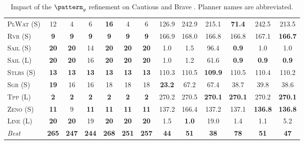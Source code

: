 \documentclass[11pt,landscape]{article}
\begin{document}
\begin{table}[tb]
{\begin{tabular}{|l||cccccc||cccccc||}
\textsc{PlWat} (S)&12&4&6&\textbf{16}&4&6&126.9&242.9&215.1&\textbf{71.4}&242.5&213.5\\
\textsc{Rvr} (S)&\textbf{9}&\textbf{9}&\textbf{9}&\textbf{9}&\textbf{9}&\textbf{9}&166.9&168.0&166.8&166.8&167.1&\textbf{166.7}\\
\textsc{Sail} (S)&\textbf{20}&\textbf{20}&14&\textbf{20}&\textbf{20}&\textbf{20}&1.0&1.5&96.4&\textbf{0.9}&1.0&1.0\\
\textsc{Sail} (L)&\textbf{20}&\textbf{20}&16&\textbf{20}&\textbf{20}&\textbf{20}&1.0&1.2&61.6&\textbf{0.9}&\textbf{0.9}&\textbf{0.9}\\
\textsc{Stlrs} (S)&\textbf{13}&\textbf{13}&\textbf{13}&\textbf{13}&\textbf{13}&\textbf{13}&110.3&110.5&\textbf{109.9}&110.5&110.4&110.2\\
\textsc{Sgr} (S)&\textbf{19}&16&16&18&18&18&\textbf{23.2}&67.2&67.4&38.7&39.8&38.6\\
\textsc{Tpp} (L)&\textbf{2}&\textbf{2}&\textbf{2}&\textbf{2}&\textbf{2}&\textbf{2}&270.2&270.5&\textbf{270.1}&\textbf{270.1}&270.2&\textbf{270.1}\\
\textsc{Zeno} (S)&\textbf{11}&9&\textbf{11}&\textbf{11}&\textbf{11}&\textbf{11}&137.2&166.4&137.2&137.1&\textbf{136.8}&\textbf{136.8}\\
\textsc{Line} (L)&\textbf{20}&\textbf{20}&19&\textbf{20}&\textbf{20}&\textbf{20}&1.5&\textbf{1.0}&19.0&1.4&1.1&5.2
\\\hline
\textit{Best}&\textbf{265}&\textbf{247}&\textbf{244}&\textbf{268}&\textbf{251}&\textbf{257}&\textbf{44}&\textbf{51}&\textbf{38}&\textbf{78}&\textbf{51}&\textbf{47}\\\hline

        \end{tabular}}
        \caption{Impact of the $\pattern_g$ refinement on Cautious and Brave \pattyd. Planner names are abbreviated.}
        \label{tab:abl-patterng}
        \end{table}
        
\end{document}
